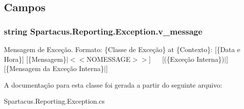\subsection{Campos}
\hypertarget{classSpartacus_1_1Reporting_1_1Exception_a503dc1f90d6ba1cdaa6b5a5e9fd5178b}{
\subsubsection[{v\+\_\+message}]{\setlength{\rightskip}{0pt plus 5cm}string Spartacus.\+Reporting.\+Exception.\+v\+\_\+message}}\label{classSpartacus_1_1Reporting_1_1Exception_a503dc1f90d6ba1cdaa6b5a5e9fd5178b}


Mensagem de Exceção. Formato\+: \{Classe de Exceção\} at \{Contexto\}\+: \mbox{[}\{Data e Hora\}\mbox{]} \mbox{[}\{Mensagem\}$\vert$$<$$<$\+N\+O\+M\+E\+S\+S\+A\+G\+E$>$$>$\mbox{]}~\newline
~\newline
 \mbox{[}(\{Exceção Interna\})$\vert$\mbox{]} \mbox{[}\{Mensagem da Exceção Interna\}$\vert$\mbox{]} 



A documentação para esta classe foi gerada a partir do seguinte arquivo\+:\begin{DoxyCompactItemize}
\item 
Spartacus.\+Reporting.\+Exception.\+cs\end{DoxyCompactItemize}
